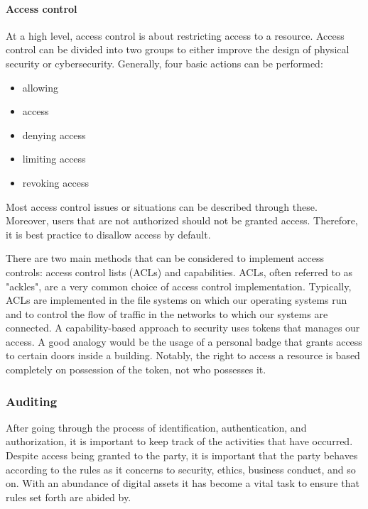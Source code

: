 \paragraph{Access control}
At a high level, access control is about restricting access to a resource. Access control can be divided into two groups to either improve the design of physical security or cybersecurity. Generally, four basic actions can be performed: 
\begin{itemize}
    \item allowing
    \item access
    \item denying access
    \item limiting access
    \item revoking access
\end{itemize}
Most access control issues or situations can be described through these. Moreover, users that are not authorized should not be granted access. Therefore, it is best practice to disallow access by default.

There are two main methods that can be considered to implement access controls: access control lists (ACLs) and capabilities. ACLs, often referred to as "ackles", are a very common choice of access control implementation. Typically, ACLs are implemented in the file systems on which our operating systems run and to control the flow of traffic in the networks to which our systems are connected. A capability-based approach to security uses tokens that manages our access. A good analogy would be the usage of a personal badge that grants access to certain doors inside a building. Notably, the right to access a resource is based completely on possession of the token, not who possesses it.

\subsubsection{Auditing}
After going through the process of identification, authentication, and authorization, it is important to keep track of the activities that have occurred. Despite access being granted to the party, it is important that the party behaves according to the rules as it concerns to security, ethics, business conduct, and so on. With an abundance of digital assets it has become a vital task to ensure that rules set forth are abided by.


